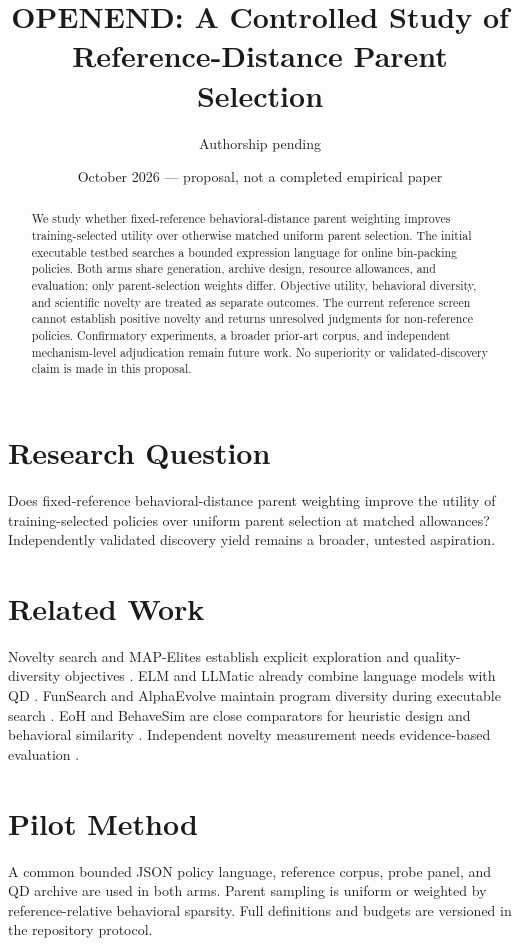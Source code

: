 \documentclass[11pt,a4paper]{article}
\title{OPENEND: A Controlled Study of Reference-Distance Parent Selection}
\author{Authorship pending}
\date{October 2026 --- proposal, not a completed empirical paper}
\begin{document}
\maketitle
\begin{abstract}
We study whether fixed-reference behavioral-distance parent weighting improves training-selected utility over otherwise matched uniform parent selection. The initial executable testbed searches a bounded expression language for online bin-packing policies. Both arms share generation, archive design, resource allowances, and evaluation; only parent-selection weights differ. Objective utility, behavioral diversity, and scientific novelty are treated as separate outcomes. The current reference screen cannot establish positive novelty and returns unresolved judgments for non-reference policies. Confirmatory experiments, a broader prior-art corpus, and independent mechanism-level adjudication remain future work. No superiority or validated-discovery claim is made in this proposal.
\end{abstract}
\section{Research Question}
Does fixed-reference behavioral-distance parent weighting improve the utility of training-selected policies over uniform parent selection at matched allowances? Independently validated discovery yield remains a broader, untested aspiration.
\section{Related Work}
Novelty search and MAP-Elites establish explicit exploration and quality-diversity objectives \citep{lehman2011abandoning,mouret2015illuminating}. ELM and LLMatic already combine language models with QD \citep{lehman2022elm,nasir2023llmatic}. FunSearch and AlphaEvolve maintain program diversity during executable search \citep{romera2024mathematical,alphaevolve2025}. EoH and BehaveSim are close comparators for heuristic design and behavioral similarity \citep{liu2024eoh,zhang2026behavesim}. Independent novelty measurement needs evidence-based evaluation \citep{novelty2025sdp,rqbench2026}.
\section{Pilot Method}
A common bounded JSON policy language, reference corpus, probe panel, and QD archive are used in both arms. Parent sampling is uniform or weighted by reference-relative behavioral sparsity. Full definitions and budgets are versioned in the repository protocol.
\end{document}

